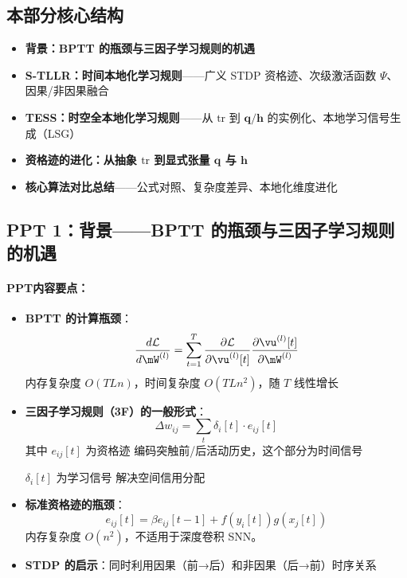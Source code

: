 \documentclass[journal,12pt,onecolumn]{IEEEtran}
\begin{document}
\subsection*{本部分核心结构}
\begin{itemize}[leftmargin=*, itemsep=0.3ex]
    \item[\textbf{1}] \textbf{背景：BPTT 的瓶颈与三因子学习规则的机遇}
    \item[\textbf{2}] \textbf{S-TLLR：时间本地化学习规则}——广义 STDP 资格迹、次级激活函数 \(\Psi\)、因果/非因果融合
    \item[\textbf{3}] \textbf{TESS：时空全本地化学习规则}——从 \(\text{tr}\) 到 \(\mathbf{q}/\mathbf{h}\) 的实例化、本地学习信号生成（LSG）
    \item[\textbf{4}] \textbf{资格迹的进化：从抽象 \(\text{tr}\) 到显式张量 \(\mathbf{q}\) 与 \(\mathbf{h}\)}
    \item[\textbf{5}] \textbf{核心算法对比总结}——公式对照、复杂度差异、本地化维度进化
\end{itemize}
\vspace{0.3cm}

\subsection*{PPT 1：背景——BPTT 的瓶颈与三因子学习规则的机遇}

\paragraph{\textbf{PPT内容要点：}}
\begin{itemize}
    \item \textbf{BPTT 的计算瓶颈}：
    \[
    \frac{d\mathcal{L}}{d\mW^{(l)}} = \sum_{t=1}^T \frac{\partial \mathcal{L}}{\partial \vu^{(l)}[t]} \frac{\partial \vu^{(l)}[t]}{\partial \mW^{(l)}}
    \]
    内存复杂度 \(O(TLn)\)，时间复杂度 \(O(TLn^2)\)，随 \(T\) 线性增长
    
    \item \textbf{三因子学习规则（3F）的一般形式}：
    \[
    \Delta w_{ij} = \sum_t \delta_i[t] \cdot e_{ij}[t]
    \]
    其中 \(e_{ij}[t]\) 为资格迹 编码突触前/后活动历史，这个部分为时间信号
    
    \(\delta_i[t]\) 为学习信号 解决空间信用分配
    
    \item \textbf{标准资格迹的瓶颈}：
    \[
    e_{ij}[t] = \beta e_{ij}[t-1] + f(y_i[t])g(x_j[t])
    \]
    内存复杂度 \(O(n^2)\)，不适用于深度卷积 SNN。
    
    \item \textbf{STDP 的启示}：同时利用因果（前→后）和非因果（后→前）时序关系
\end{itemize}
\end{document}
